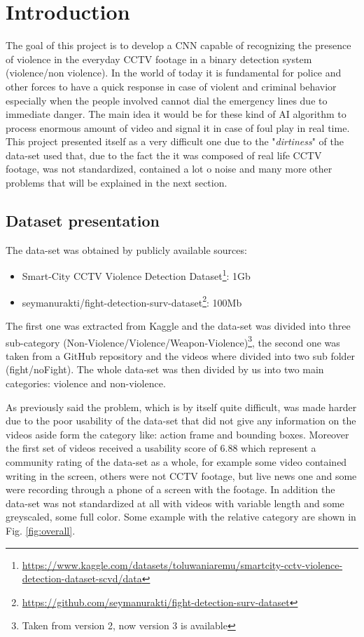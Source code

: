 \chapter{Introduction}
The goal of this project is to develop a CNN capable of recognizing the presence of violence in the everyday CCTV footage in a binary detection system (violence/non violence). In the world of today it is fundamental for police and other forces to have a quick response in case of violent and criminal behavior especially when the people involved cannot dial the emergency lines due to immediate danger. The main idea it would be for these kind of AI algorithm to process enormous amount of video and signal it in case of foul play in real time. This project presented itself as a very difficult one due to the "\textit{dirtiness}" of the data-set used that, due to the fact the it was composed of real life CCTV footage, was not standardized, contained a lot o noise and many more other problems that will be explained in the next section.

\section{Dataset presentation}
The data-set was obtained by publicly available sources:
\begin{itemize}
	\item Smart-City CCTV Violence Detection Dataset\footnote{\url{https://www.kaggle.com/datasets/toluwaniaremu/smartcity-cctv-violence-detection-dataset-scvd/data}}: 1Gb
	\item seymanurakti/fight-detection-surv-dataset\footnote{\url{https://github.com/seymanurakti/fight-detection-surv-dataset}}: 100Mb
\end{itemize}

The first one was extracted from Kaggle and the data-set was divided into three sub-category (Non-Violence/Violence/Weapon-Violence)\footnote{Taken from version 2, now version 3 is available}, the second one was taken from a GitHub repository and the videos where divided into two sub folder (fight/noFight). The whole data-set was then divided by us into two main categories: violence and non-violence.

As previously said the problem, which is by itself quite difficult, was made harder due to the poor usability of the data-set that did not give any information on the videos aside form the category like: action frame and bounding boxes. Moreover the first set of videos received a usability score of 6.88 which represent a community rating of the data-set as a whole, for example some video contained writing in the screen, others were not CCTV footage, but live news one and some were recording through a phone of a screen with the footage. In addition the data-set was not standardized at all with videos with variable length and some greyscaled, some full color. Some example with the relative category are shown in Fig. \ref*{fig:overall}.

